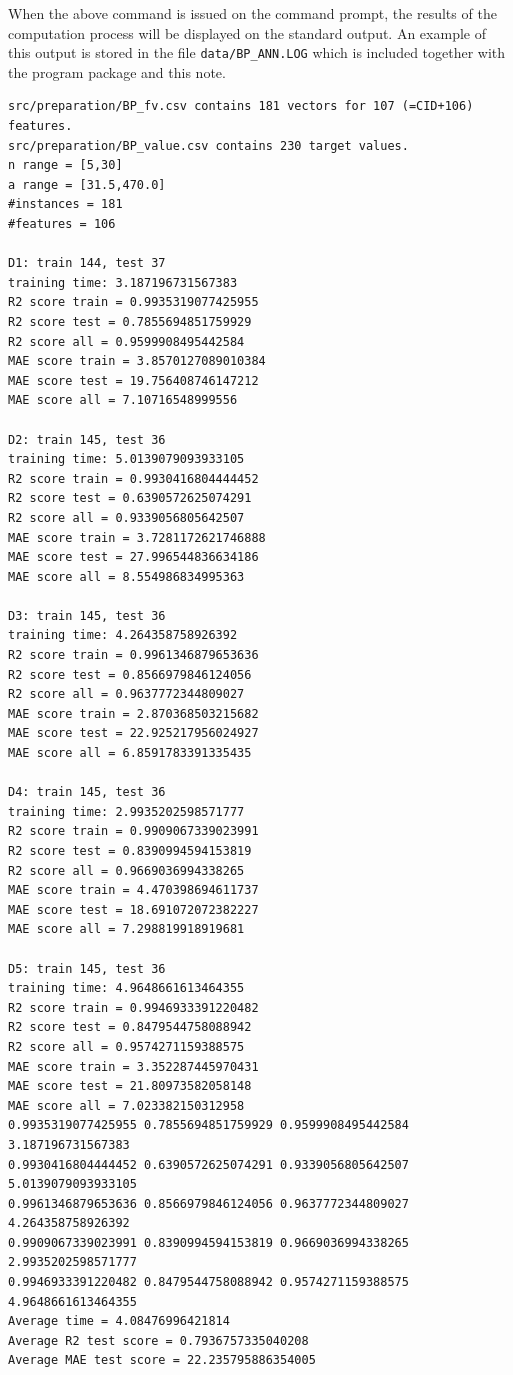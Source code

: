 \documentclass[11pt,titlepage,dvipdfmx,twoside]{book}
\begin{document}
When the above command is issued on the command prompt,
the results of the computation process will be displayed on the 
standard output.
An example of this output is stored in the file
\verb|data/BP_ANN.LOG| which is included together with
the program package and this note.
\begin{oframed}
  {\small
\begin{verbatim}
src/preparation/BP_fv.csv contains 181 vectors for 107 (=CID+106) features.
src/preparation/BP_value.csv contains 230 target values.
n range = [5,30]
a range = [31.5,470.0]
#instances = 181
#features = 106

D1: train 144, test 37
training time: 3.187196731567383
R2 score train = 0.9935319077425955
R2 score test = 0.7855694851759929
R2 score all = 0.9599908495442584
MAE score train = 3.8570127089010384
MAE score test = 19.756408746147212
MAE score all = 7.10716548999556

D2: train 145, test 36
training time: 5.0139079093933105
R2 score train = 0.9930416804444452
R2 score test = 0.6390572625074291
R2 score all = 0.9339056805642507
MAE score train = 3.7281172621746888
MAE score test = 27.996544836634186
MAE score all = 8.554986834995363

D3: train 145, test 36
training time: 4.264358758926392
R2 score train = 0.9961346879653636
R2 score test = 0.8566979846124056
R2 score all = 0.9637772344809027
MAE score train = 2.870368503215682
MAE score test = 22.925217956024927
MAE score all = 6.8591783391335435

D4: train 145, test 36
training time: 2.9935202598571777
R2 score train = 0.9909067339023991
R2 score test = 0.8390994594153819
R2 score all = 0.9669036994338265
MAE score train = 4.470398694611737
MAE score test = 18.691072072382227
MAE score all = 7.298819918919681

D5: train 145, test 36
training time: 4.9648661613464355
R2 score train = 0.9946933391220482
R2 score test = 0.8479544758088942
R2 score all = 0.9574271159388575
MAE score train = 3.352287445970431
MAE score test = 21.80973582058148
MAE score all = 7.023382150312958
0.9935319077425955 0.7855694851759929 0.9599908495442584 3.187196731567383
0.9930416804444452 0.6390572625074291 0.9339056805642507 5.0139079093933105
0.9961346879653636 0.8566979846124056 0.9637772344809027 4.264358758926392
0.9909067339023991 0.8390994594153819 0.9669036994338265 2.9935202598571777
0.9946933391220482 0.8479544758088942 0.9574271159388575 4.9648661613464355
Average time = 4.08476996421814
Average R2 test score = 0.7936757335040208
Average MAE test score = 22.235795886354005
  \end{verbatim}        
}
\end{oframed}
\end{document}
